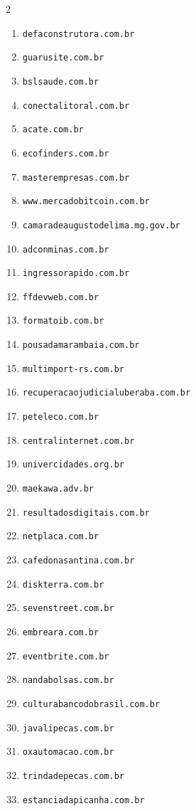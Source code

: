 \begin{multicols}{2}
\begin{enumerate}
    \item \texttt{defaconstrutora.com.br}
    \item \texttt{guarusite.com.br}
    \item \texttt{bslsaude.com.br}
    \item \texttt{conectalitoral.com.br}
    \item \texttt{acate.com.br}
    \item \texttt{ecofinders.com.br}
    \item \texttt{masterempresas.com.br}
    \item \texttt{www.mercadobitcoin.com.br}
    \item \texttt{camaradeaugustodelima.mg.gov.br}
    \item \texttt{adconminas.com.br}
    \item \texttt{ingressorapido.com.br}
    \item \texttt{ffdevweb.com.br}
    \item \texttt{formatoib.com.br}
    \item \texttt{pousadamarambaia.com.br}
    \item \texttt{multimport-rs.com.br}
    \item \texttt{recuperacaojudicialuberaba.com.br}
    \item \texttt{peteleco.com.br}
    \item \texttt{centralinternet.com.br}
    \item \texttt{univercidades.org.br}
    \item \texttt{maekawa.adv.br}
    \item \texttt{resultadosdigitais.com.br}
    \item \texttt{netplaca.com.br}
    \item \texttt{cafedonasantina.com.br}
    \item \texttt{diskterra.com.br}
    \item \texttt{sevenstreet.com.br}
    \item \texttt{embreara.com.br}
    \item \texttt{eventbrite.com.br}
    \item \texttt{nandabolsas.com.br}
    \item \texttt{culturabancodobrasil.com.br}
    \item \texttt{javalipecas.com.br}
    \item \texttt{oxautomacao.com.br}
    \item \texttt{trindadepecas.com.br}
    \item \texttt{estanciadapicanha.com.br}

\end{enumerate}
\end{multicols}
